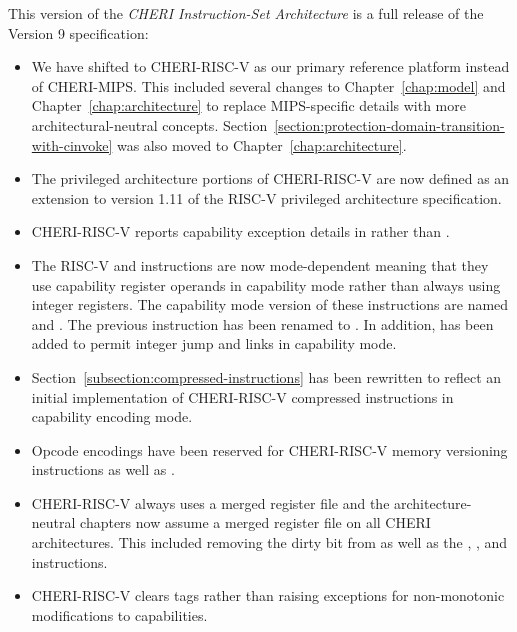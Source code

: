 This version of the \textit{CHERI Instruction-Set Architecture} is a full
release of the Version 9 specification:

\begin{itemize}
\item We have shifted to CHERI-RISC-V as our primary reference
  platform instead of CHERI-MIPS.  This included several changes to
  Chapter~\ref{chap:model} and Chapter~\ref{chap:architecture} to
  replace MIPS-specific details with more architectural-neutral
  concepts.
  Section~\ref{section:protection-domain-transition-with-cinvoke} was
  also moved to Chapter~\ref{chap:architecture}.

\item The privileged architecture portions of CHERI-RISC-V are now
  defined as an extension to version 1.11 of the RISC-V privileged
  architecture specification.

\item CHERI-RISC-V reports capability exception details in \xtval{}
  rather than \xccsr{}.

\item The RISC-V  and  instructions are
  now mode-dependent meaning that they use capability register
  operands in capability mode rather than always using integer
  registers.  The capability mode version of these instructions are
  named  and .  The previous
   instruction has been renamed to
  .  In addition,  has been added
  to permit integer jump and links in capability mode.

\item Section~\ref{subsection:compressed-instructions} has been
  rewritten to reflect an initial implementation of CHERI-RISC-V
  compressed instructions in capability encoding mode.

\item Opcode encodings have been reserved for CHERI-RISC-V memory
  versioning instructions as well as .

\item CHERI-RISC-V always uses a merged register file and the
  architecture-neutral chapters now assume a merged register file on
  all CHERI architectures.  This included removing the dirty bit from
  \xccsr{} as well as the , , and
   instructions.

\item CHERI-RISC-V clears tags rather than raising exceptions for
  non-monotonic modifications to capabilities.


\end{itemize}
